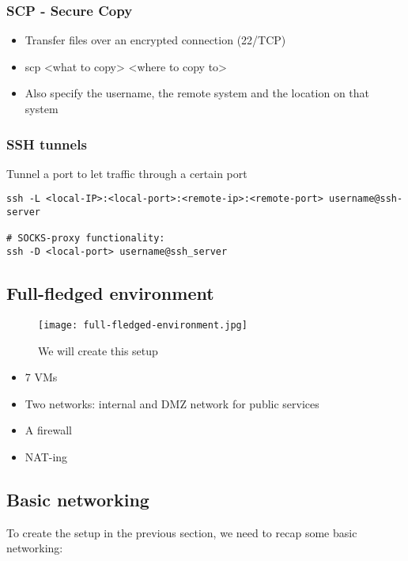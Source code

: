 \documentclass{article}
\begin{document}
\subsubsection{SCP - Secure Copy}

\begin{itemize}
    \item Transfer files over an encrypted connection (22/TCP)
    \item scp <what to copy> <where to copy to>
    \item Also specify the username, the remote system and the location on that system
\end{itemize}

\subsubsection{SSH tunnels}

Tunnel a port to let traffic through a certain port

\begin{verbatim}
ssh -L <local-IP>:<local-port>:<remote-ip>:<remote-port> username@ssh-server

# SOCKS-proxy functionality:
ssh -D <local-port> username@ssh_server
\end{verbatim}

\subsection{Full-fledged environment}

\begin{figure}[H]
    \centering
    \texttt{[image: full-fledged-environment.jpg]}
    \caption{We will create this setup}
\end{figure}

\begin{itemize}
    \item 7 VMs
    \item Two networks: internal and DMZ network for public services
    \item A firewall
    \item NAT-ing
\end{itemize}

\subsection{Basic networking}

To create the setup in the previous section, we need to recap some basic networking:
\end{document}
